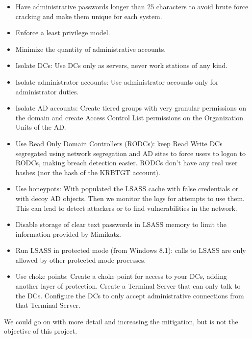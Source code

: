 \begin{itemize}
	\item Have administrative passwords longer than 25 characters to avoid brute force cracking and make them unique for each system.
	\item Enforce a least privilege model.
	\item Minimize the quantity of administrative accounts.
	\item Isolate DCs: Use DCs only as servers, never work stations of any kind.
	\item Isolate administrator accounts: Use administrator accounts only for administrator duties.
	\item Isolate AD accounts: Create tiered groups with very granular permissions on the domain and create Access Control List permissions on the Organization Units of the AD\cite{AD_tier}.
	\item Use Read Only Domain Controllers (RODCs): keep Read Write DCs segregated using network segregation and AD sites to force users to logon to RODCs, making breach detection easier. RODCs don't have any real user hashes (nor the hash of the KRBTGT account)\cite{hood}\cite{reset_RODC}.
	\item Use honeypots: With populated the LSASS cache with false credentials\cite{SANS_mimikatz}\cite{honeyhashes} or with decoy AD objects\cite{decoy_AD}. Then we monitor the logs for attempts to use them. This can lead to detect attackers or to find vulnerabilities in the network.
	\item Disable storage of clear text passwords in LSASS memory to limit the information provided by Mimikatz\cite{SANS_mimikatz}.
	\item Run LSASS in protected mode (from Windows 8.1): calls to LSASS are only allowed by other protected-mode processes\cite{SANS_mimikatz}\cite{understanding_powersploit_mimikatz}.
	\item Use choke points: Create a choke point for access to your DCs, adding another layer of protection. Create a Terminal Server that can only talk to the DCs. Configure the DCs to only accept administrative connections from that Terminal Server\cite{choke}.
\end{itemize}
\linej
We could go on with more detail and increasing the mitigation\cite{AD_defense}, but is not the objective of this project.

